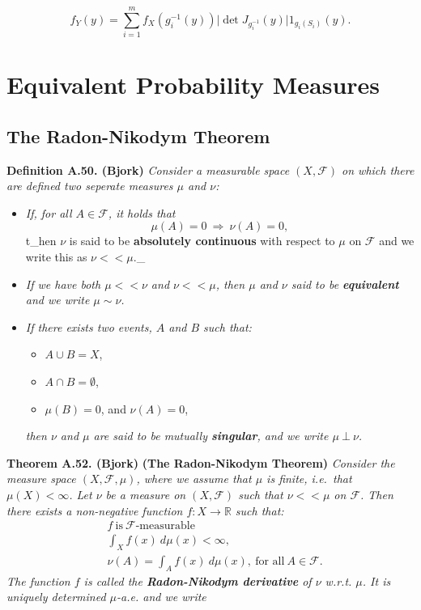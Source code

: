 \documentclass[
]{book}
\providecommand{\tightlist}{%
  \setlength{\itemsep}{0pt}\setlength{\parskip}{0pt}}
\begin{document}
\[
f_Y(y)=\sum_{i=1}^m f_X(g_i^{-1}(y))\vert\det J_{g_i^{-1}}(y)\vert1_{g_i(S_i)}(y).
\]

\hypertarget{equivalent-probability-measures}{%
\section{Equivalent Probability Measures}\label{equivalent-probability-measures}}

\hypertarget{the-radon-nikodym-theorem}{%
\subsection{The Radon-Nikodym Theorem}\label{the-radon-nikodym-theorem}}

\textbf{Definition A.50. (Bjork)} \emph{Consider a measurable space \((X,\mathcal{F})\) on which there are defined two seperate measures \(\mu\) and \(\nu\):}

\begin{itemize}
\item
  \emph{If, for all \(A\in \mathcal{F}\), it holds that}
  \[
    \mu(A)=0\ \Rightarrow\ \nu(A)=0,\tag{A.7}
    \]
  t\_hen \(\nu\) is said to be \textbf{absolutely continuous} with respect to \(\mu\) on \(\mathcal{F}\) and we write this as \(\nu < < \mu\).\_
\item
  \emph{If we have both \(\mu << \nu\) and \(\nu << \mu\), then \(\mu\) and \(\nu\) said to be \textbf{equivalent} and we write \(\mu\sim \nu\).}
\item
  \emph{If there exists two events, \(A\) and \(B\) such that:}

  \begin{itemize}
  \tightlist
  \item
    \(A\cup B=X\),
  \item
    \(A\cap B=\emptyset\),
  \item
    \(\mu(B)=0\), and \(\nu(A)=0\),
  \end{itemize}

  \emph{then \(\nu\) and \(\mu\) are said to be mutually \textbf{singular}, and we write \(\mu\ \bot\ \nu\).}
\end{itemize}

\textbf{Theorem A.52. (Bjork)} \textbf{(The Radon-Nikodym Theorem)} \emph{Consider the measure space \((X,\mathcal{F},\mu)\), where we assume that \(\mu\) is finite, i.e.~that \(\mu(X)<\infty\). Let \(\nu\) be a measure on \((X,\mathcal{F})\) such that \(\nu <<\mu\) on \(\mathcal{F}\). Then there exists a non-negative function \(f : X\to \mathbb{R}\) such that:}
\begin{align*}
&f\ \text{is}\ \mathcal{F}\text{-measurable}\tag{A.9}\\
&\int_X f(x)\ d\mu(x)<\infty,\tag{A.10}\\
&\nu(A)=\int_Af(x)\ d\mu(x),\ \text{for all}\ A\in \mathcal{F}.\tag{A.11}
\end{align*}
\emph{The function \(f\) is called the \textbf{Radon-Nikodym derivative} of \(\nu\) w.r.t. \(\mu\). It is uniquely determined \(\mu\)-a.e. and we write}
\end{document}
